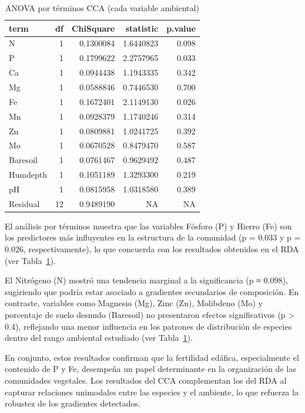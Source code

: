 \documentclass[
  spanish,
  11pt,
  a4paper,
  DIV=11,
  numbers=noendperiod]{scrartcl}
\begin{document}
\begin{longtable}[]{@{}lrrrr@{}}

\caption{\label{tbl-anova-terminos-cca}ANOVA por términos CCA (cada
variable ambiental)}

\tabularnewline

\toprule\noalign{}
term & df & ChiSquare & statistic & p.value \\
\midrule\noalign{}
\endhead
\bottomrule\noalign{}
\endlastfoot
N & 1 & 0.1300084 & 1.6440823 & 0.098 \\
P & 1 & 0.1799622 & 2.2757965 & 0.033 \\
Ca & 1 & 0.0944438 & 1.1943335 & 0.342 \\
Mg & 1 & 0.0588846 & 0.7446530 & 0.700 \\
Fe & 1 & 0.1672401 & 2.1149130 & 0.026 \\
Mn & 1 & 0.0928379 & 1.1740246 & 0.314 \\
Zn & 1 & 0.0809881 & 1.0241725 & 0.392 \\
Mo & 1 & 0.0670528 & 0.8479470 & 0.587 \\
Baresoil & 1 & 0.0761467 & 0.9629492 & 0.487 \\
Humdepth & 1 & 0.1051189 & 1.3293300 & 0.219 \\
pH & 1 & 0.0815958 & 1.0318580 & 0.389 \\
Residual & 12 & 0.9489190 & NA & NA \\

\end{longtable}

El análisis por términos muestra que las variables Fósforo (P) y Hierro
(Fe) son los predictores más influyentes en la estructura de la
comunidad (p = 0.033 y p = 0.026, respectivamente), lo que concuerda con
los resultados obtenidos en el RDA (ver
Tabla~\ref{tbl-anova-terminos-cca}).

El Nitrógeno (N) mostró una tendencia marginal a la significancia (p ≈
0.098), sugiriendo que podría estar asociado a gradientes secundarios de
composición. En contraste, variables como Magnesio (Mg), Zinc (Zn),
Molibdeno (Mo) y porcentaje de suelo desnudo (Baresoil) no presentaron
efectos significativos (p \textgreater{} 0.4), reflejando una menor
influencia en los patrones de distribución de especies dentro del rango
ambiental estudiado (ver Tabla~\ref{tbl-anova-terminos-cca}).

En conjunto, estos resultados confirman que la fertilidad edáfica,
especialmente el contenido de P y Fe, desempeña un papel determinante en
la organización de las comunidades vegetales. Los resultados del CCA
complementan los del RDA al capturar relaciones unimodales entre las
especies y el ambiente, lo que refuerza la robustez de los gradientes
detectados.
\end{document}
